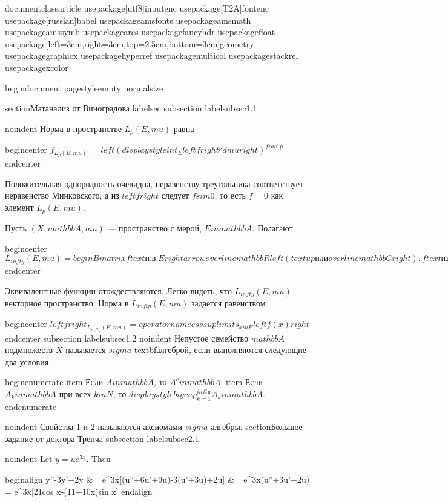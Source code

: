 documentclass{article}
usepackage[utf8]{inputenc}
usepackage[T2A]{fontenc}
usepackage[russian]{babel}
usepackage{amsfonts}
usepackage{amsmath}
usepackage{amssymb}
usepackage{arcs}
usepackage{fancyhdr}
usepackage{float}
usepackage[left=3cm,right=3cm,top=2.5cm,bottom=3cm]{geometry}
usepackage{graphicx}
usepackage{hyperref}
usepackage{multicol}
usepackage{stackrel}
usepackage{xcolor}


begin{document}
pagestyle{empty}
normalsize

section{Матанализ от Виноградова}
label{sec}
subsection{}
label{subsec1.1}

noindent Норма в пространстве $L_{p}(E, mu)$ равна

begin{center}
$ f _{L_{p}(E, mu))}=left (displaystyle {int_E}left  f right ^{p}dmu  right )^{frac{1}{p}}$
end{center}


Положительная однородность очевидна, неравенству треугольника соответствует неравенство Минковского, а из $left  f right $ следует $fsim 0$, то есть $f=0$ как элемент $L_{p}(E, mu)$.

Пусть $(X, mathbb{A}, mu)$ — пространство с мерой, $E in mathbb{A}$. Полагают


begin{center}
$L_{infty} (E, mu) = 
begin{Bmatrix}
 f text{п.в.} E rightarrow overline{mathbb{R}} left ( textup{или}overline{mathbb{C}} right ),  
 ftext{измерима},  
 operatorname{ess}  suplimits_{x in E}  left f(x) right  + infty
end{Bmatrix}$
end{center}


Эквивалентные функции отождествляются. Легко видеть, что $L_{infty}(E, mu)$ — векторное пространство. Норма в $L_{infty}(E, mu)$ задается равенством


begin{center}
$left  f right _{L_{infty}(E, mu)} = operatorname{ess}  suplimits_{x in E}
 left f(x) right $
end{center}
subsection{}
label{subsec1.2}
noindent Непустое семейство $mathbb{A}$ подмножеств $X$ называется $sigma$-textbf{алгеброй}, если выполняются следующие два условия.

begin{enumerate}
  item Если $A in mathbb{A}$, то $A^{c} in mathbb{A}$.
  item Если $A_{k} in mathbb{A}$ при всех $k in N$, то $displaystyle bigcup_{k=1}^{infty} A_{k} in mathbb{A}$.
end{enumerate}


noindent Свойства 1 и 2 называются аксиомами $sigma$-алгебры.
section{Большое задание от доктора Тренча}
subsection{}
label{subsec2.1}


noindent Let $y=ue^{3x}$. Then 


begin{align}
{y}''-3{y}'+2y &= e^{3x}[({u}''+6{u}'+9u)-3({u}'+3u)+2u] 
&= e^{3x}({u}''+3{u}'+2u) = e^{3x}[21cos x-(11+10x)sin x]
end{align}

